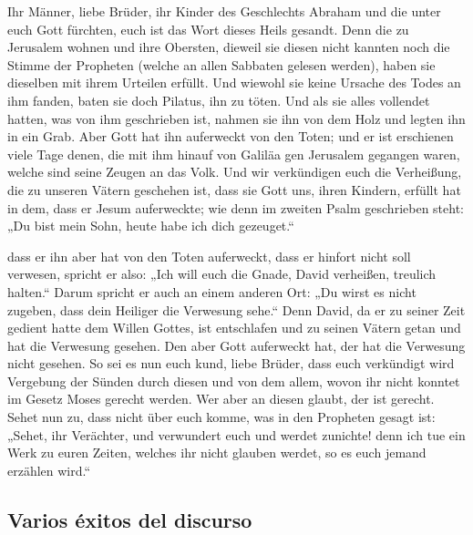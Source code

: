  Ihr Männer, liebe Brüder, ihr Kinder des Geschlechts
Abraham und die unter euch Gott fürchten, euch ist das Wort dieses Heils
gesandt.  Denn die zu Jerusalem wohnen und ihre Obersten,
dieweil sie diesen nicht kannten noch die Stimme der Propheten (welche
an allen Sabbaten gelesen werden), haben sie dieselben mit ihrem
Urteilen erfüllt.  Und wiewohl sie keine Ursache des
Todes an ihm fanden, baten sie doch Pilatus, ihn zu töten.
 Und als sie alles vollendet hatten, was von ihm
geschrieben ist, nahmen sie ihn von dem Holz und legten ihn in ein Grab.
 Aber Gott hat ihn auferweckt von den Toten;
 und er ist erschienen viele Tage denen, die mit ihm
hinauf von Galiläa gen Jerusalem gegangen waren, welche sind seine
Zeugen an das Volk.  Und wir verkündigen euch die
Verheißung, die zu unseren Vätern geschehen ist,  dass
sie Gott uns, ihren Kindern, erfüllt hat in dem, dass er Jesum
auferweckte; wie denn im zweiten Psalm geschrieben steht: „Du bist mein
Sohn, heute habe ich dich gezeuget.``

 dass er ihn aber hat von den Toten auferweckt, dass er
hinfort nicht soll verwesen, spricht er also: „Ich will euch die Gnade,
David verheißen, treulich halten.``  Darum spricht er
auch an einem anderen Ort: „Du wirst es nicht zugeben, dass dein
Heiliger die Verwesung sehe.``  Denn David, da er zu
seiner Zeit gedient hatte dem Willen Gottes, ist entschlafen und zu
seinen Vätern getan und hat die Verwesung gesehen.  Den
aber Gott auferweckt hat, der hat die Verwesung nicht gesehen.
 So sei es nun euch kund, liebe Brüder, dass euch
verkündigt wird Vergebung der Sünden durch diesen und von dem allem,
wovon ihr nicht konntet im Gesetz Moses gerecht werden. 
Wer aber an diesen glaubt, der ist gerecht.  Sehet nun
zu, dass nicht über euch komme, was in den Propheten gesagt ist:
 „Sehet, ihr Verächter, und verwundert euch und werdet
zunichte! denn ich tue ein Werk zu euren Zeiten, welches ihr nicht
glauben werdet, so es euch jemand erzählen wird.``

\hypertarget{varios-uxe9xitos-del-discurso}{%
\subsection{Varios éxitos del
discurso}\label{varios-uxe9xitos-del-discurso}}

